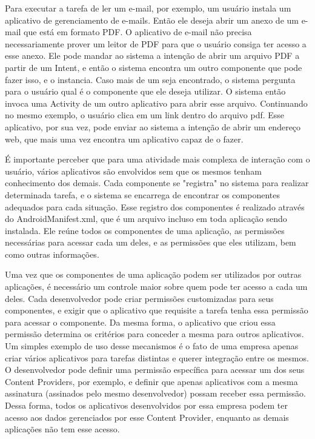 Para executar a tarefa de ler um e-mail, por exemplo, um usuário instala um aplicativo de gerenciamento de e-mails. Então ele deseja abrir um anexo de um e-mail que está em formato PDF. O aplicativo de e-mail não precisa necessariamente prover um leitor de PDF para que o usuário consiga ter acesso a esse anexo. Ele pode mandar ao sistema a intenção de abrir um arquivo PDF a partir de um Intent, e então o sistema encontra um outro componente que pode fazer isso, e o instancia. Caso mais de um seja encontrado, o sistema pergunta para o usuário qual é o componente que ele deseja utilizar. O sistema então invoca uma Activity de um outro aplicativo para abrir esse arquivo. Continuando no mesmo exemplo, o usuário clica em um link dentro do arquivo pdf. Esse aplicativo, por sua vez, pode enviar ao sistema a intenção de abrir um endereço web, que mais uma vez encontra um aplicativo capaz de o fazer.  

É importante perceber que para uma atividade mais complexa de interação com o usuário, vários aplicativos são envolvidos sem que os mesmos tenham conhecimento dos demais. Cada componente se "registra" no sistema para realizar determinada tarefa, e o sistema se encarrega de encontrar os componentes adequados para cada situação. Esse registro dos componentes é realizado através do AndroidManifest.xml, que é um arquivo incluso em toda aplicação sendo instalada. Ele reúne todos os componentes de uma aplicação, as permissões necessárias para acessar cada um deles, e as permissões que eles utilizam, bem como outras informações. 

Uma vez que os componentes de uma aplicação podem ser utilizados por outras aplicações, é necessário um controle maior sobre quem pode ter acesso a cada um deles. Cada desenvolvedor pode criar permissões customizadas para seus componentes, e exigir que o aplicativo que requisite a tarefa tenha essa permissão para acessar o componente. Da mesma forma, o aplicativo que criou essa permissão determina os critérios para conceder a mesma para outros aplicativos. Um simples exemplo de uso desse mecanismos é o fato de uma empresa apenas criar vários aplicativos para tarefas distintas e querer integração entre os mesmos. O desenvolvedor pode definir uma permissão específica para acessar um dos seus Content Providers, por exemplo, e definir que apenas aplicativos com a mesma assinatura (assinados pelo mesmo desenvolvedor) possam receber essa permissão. Dessa forma, todos os aplicativos desenvolvidos por essa empresa podem ter acesso aos dados gerenciados por esse Content Provider, enquanto as demais aplicações não tem esse acesso. 

